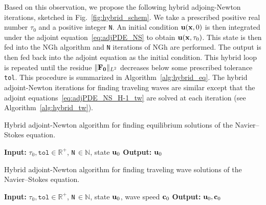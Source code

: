 \documentclass{jfm}
\begin{document}
Based on this observation, we propose the following hybrid adjoing-Newton iterations,
sketched in Fig.~\ref{fig:hybrid_schem}.
We take
a prescribed positive real number $\tau_0$ and a positive integer \texttt{N}. An initial
condition $\mathbf u(\mathbf x,0)$ is then integrated under the adjoint equation~\eqref{eq:adjPDE_NS} to
obtain $\mathbf u(\mathbf x,\tau_0)$. This state is then fed into the NGh algorithm and \texttt{N}
iterations of NGh are performed. The output is then fed back into the adjoint equation
as the initial condition. This hybrid loop is repeated until the residue $\|\mathbf F_{\mathbf 0}\|_{L^2}$
decreases below some prescribed tolerance \texttt{tol}. This procedure is summarized
in Algorithm~\ref{alg:hybrid_eq}.
The hybrid adjoint-Newton iterations for finding traveling waves are similar except
that the adjoint equations~\eqref{eq:adjPDE_NS_H-1_tw} are solved at each iteration
(see Algorithm~\ref{alg:hybrid_tw}).
\begin{algorithm}
\DontPrintSemicolon
\caption{Hybrid adjoint-Newton algorithm for finding equilibrium solutions of the
Navier--Stokes equation.}
\textbf{Input:} $\tau_0,\texttt{tol}\in\mathbb R^+$,
\texttt{N}$\,\in\mathbb N$, state $\mathbf
u_0$\;
\textbf{Output:} $\mathbf u_0$
\label{alg:hybrid_eq}
\end{algorithm}
%
\begin{algorithm}
\DontPrintSemicolon
\caption{Hybrid adjoint-Newton algorithm for finding traveling wave solutions of the
Navier--Stokes equation.}
\textbf{Input:} $\tau_0,\texttt{tol}\in\mathbb R^+$,
\texttt{N}$\,\in\mathbb N$, state $\mathbf u_0$, wave speed $\mathbf c_0$\;
\textbf{Output:} $\mathbf u_0, \mathbf c_0$
\label{alg:hybrid_tw}
\end{algorithm}
\end{document}
